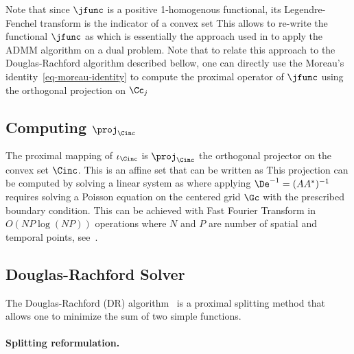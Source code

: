 Note that since $\jfunc$ is a positive 1-homogenous functional, its Legendre-Fenchel transform is the indicator of a convex set
This allows to re-write the functional $\jfunc$ as
which is essentially the approach used in \cite{Benamou2000} to apply the ADMM algorithm on a dual problem. Note that to relate this approach to the Douglas-Rachford algorithm described bellow, one can directly use the Moreau's identity~\eqref{eq-moreau-identity} to compute the proximal operator of $\jfunc$ using the orthogonal projection on $\Cc_j$


\subsection{Computing $\proj_{\Cinc}$}

The proximal mapping of $\iota_\Cinc$ is $\proj_{\Cinc}$ the orthogonal projector on the convex set $\Cinc$. This is an affine set that can be written as 
This projection can be computed by solving a linear system as
where applying $\De^{-1} = (AA^*)^{-1}$ requires solving a Poisson equation on the centered grid $\Gc$ with the prescribed boundary condition. This can be achieved with Fast Fourier Transform in $O(NP \log(NP))$ operations where $N$ and $P$ are number of spatial and temporal points, see~\cite{Strang1988}. 



\subsection{Douglas-Rachford Solver}
\label{DR-algo}

The Douglas-Rachford (DR) algorithm~\cite{Lions-Mercier-DR} is a proximal splitting method that allows one to minimize the sum of two simple functions. 

\paragraph{Splitting reformulation.}

